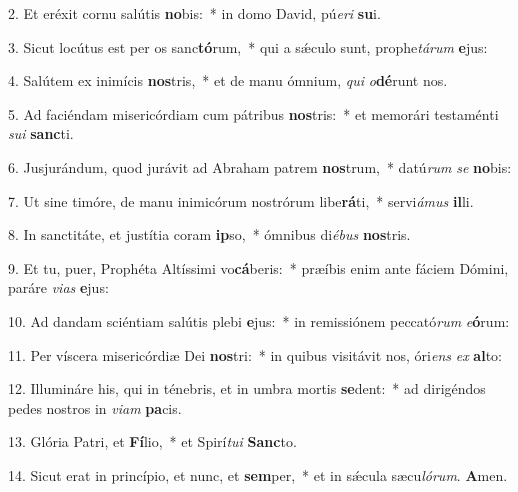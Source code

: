 
2. Et eréxit cornu salútis \textbf{no}bis:~* in domo David, pú\textit{e}\textit{ri} \textbf{su}i.

3. Sicut locútus est per os sanc\textbf{tó}rum,~* qui a s\'{\ae}culo sunt, prophe\textit{tá}\textit{rum} \textbf{e}jus:

4. Salútem ex inimícis \textbf{nos}tris,~* et de manu ómnium, \textit{qui} \textit{o}\textbf{dé}runt nos.

5. Ad faciéndam misericórdiam cum pátribus \textbf{nos}tris:~* et memorári testaménti \textit{su}\textit{i} \textbf{sanc}ti.

6. Jusjurándum, quod jurávit ad Abraham patrem \textbf{nos}trum,~* datú\textit{rum} \textit{se} \textbf{no}bis:

7. Ut sine timóre, de manu inimicórum nostrórum libe\textbf{rá}ti,~* servi\textit{á}\textit{mus} \textbf{il}li.

8. In sanctitáte, et justítia coram \textbf{ip}so,~* ómnibus di\textit{é}\textit{bus} \textbf{nos}tris.

9. Et tu, puer, Prophéta Altíssimi vo\textbf{cá}beris:~* præíbis enim ante fáciem Dómini, paráre \textit{vi}\textit{as} \textbf{e}jus:

10. Ad dandam sciéntiam salútis plebi \textbf{e}jus:~* in remissiónem peccató\textit{rum} \textit{e}\textbf{ó}rum:

11. Per víscera misericórdiæ Dei \textbf{nos}tri:~* in quibus visitávit nos, óri\textit{ens} \textit{ex} \textbf{al}to:

12. Illumináre his, qui in ténebris, et in umbra mortis \textbf{se}dent:~* ad dirigéndos pedes nostros in \textit{vi}\textit{am} \textbf{pa}cis.

13. Glória Patri, et \textbf{Fí}lio,~* et Spirí\textit{tu}\textit{i} \textbf{Sanc}to.

14. Sicut erat in princípio, et nunc, et \textbf{sem}per,~* et in s\'{\ae}cula sæcu\textit{ló}\textit{rum}. \textbf{A}men.